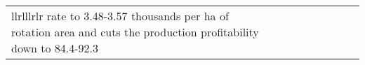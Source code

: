 \begin{longtable}{lllllllll}{llrlllrlr}
rate to 3.48-3.57 thousands per ha of rotation area and cuts the production profitability down to 84.4-92.3 %
\end{longtable}
